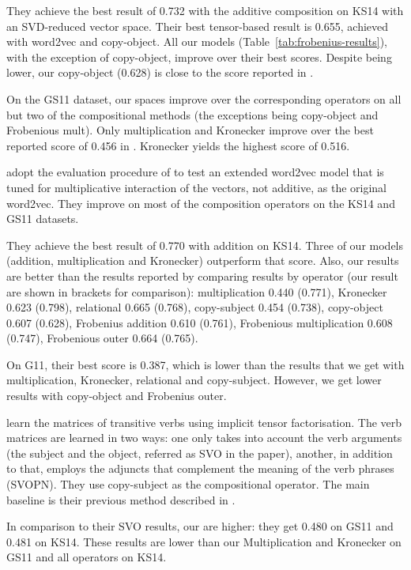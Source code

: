 They achieve the best result of 0.732 with the additive composition on KS14 with an SVD-reduced vector space. Their best tensor-based result is 0.655, achieved with word2vec and copy-object. All our models (Table~\ref{tab:frobenius-results}), with the exception of copy-object, improve over their best scores. Despite being lower, our copy-object (0.628) is close to the score reported in .

On the GS11 dataset, our spaces improve over the corresponding operators on all but two of the compositional methods (the exceptions being copy-object and Frobenious mult). Only multiplication and Kronecker improve over the best reported score of 0.456 in . Kronecker yields the highest score of 0.516.

 adopt the evaluation procedure of  to test an extended word2vec model that is tuned for multiplicative interaction of the vectors, not additive, as the original word2vec. They improve on most of the composition operators on the KS14 and GS11 datasets.

They achieve the best result of 0.770 with addition on KS14. Three of our models (addition, multiplication and Kronecker) outperform that score. Also, our results are better than the results reported  by comparing results by operator (our result are shown in brackets for comparison): multiplication 0.440 (0.771), Kronecker 0.623 (0.798), relational 0.665 (0.768), copy-subject 0.454 (0.738), copy-object 0.607 (0.628), Frobenius addition 0.610 (0.761), Frobenious multiplication 0.608 (0.747), Frobenious outer 0.664 (0.765).

On G11, their best score is 0.387, which is lower than the results that we get with multiplication, Kronecker, relational and copy-subject. However, we get lower results with copy-object and Frobenius outer.

 learn the matrices of transitive verbs using implicit tensor factorisation. The verb matrices are learned in two ways: one only takes into account the verb arguments (the subject and the object, referred as SVO in the paper), another, in addition to that, employs the adjuncts that complement the meaning of the verb phrases (SVOPN). They use copy-subject as the compositional operator. The main baseline is their previous method described in .

In comparison to their SVO results, our are higher: they get 0.480 on GS11 and 0.481 on KS14. These results are lower than our Multiplication and Kronecker on GS11 and all operators on KS14.

